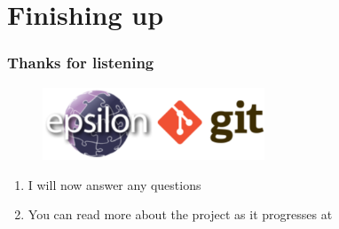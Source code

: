 \documentclass[aspectratio=1610]{beamer}
\begin{document}
\section{Finishing up}
\begin{frame}
\frametitle{Thanks for listening}
\begin{figure}[H]
	\centering
	\includegraphics[width=250px]{images/epsilon-git.png}
\end{figure} 
\begin{enumerate}
	\item I will now answer any questions
	\item You can read more about the project as it progresses at \vspace{10 mm}
\end{enumerate}
\end{frame}
\end{document}
